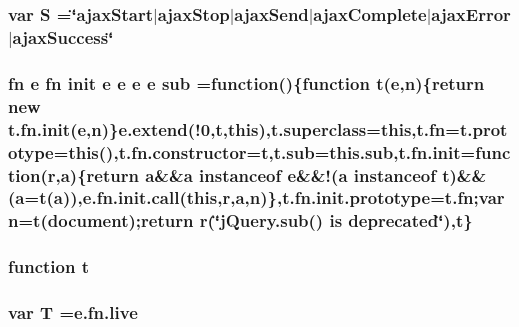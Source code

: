 \subsubsection[{S}]{\setlength{\rightskip}{0pt plus 5cm}var S =\char`\"{}ajax\+Start$\vert$ajax\+Stop$\vert$ajax\+Send$\vert$ajax\+Complete$\vert$ajax\+Error$\vert$ajax\+Success\char`\"{}}\label{jquery-migrate-1_82_81_8min_8js_a8bab16140cede5f71c657e8dc46c1887}
\hypertarget{jquery-migrate-1_82_81_8min_8js_abd5a235e9c4fffc368643d11d7701930}{}
\subsubsection[{sub}]{ {\bf fn} {\bf e} {\bf fn} {\bf init} {\bf e} {\bf e} {\bf e} {\bf e} sub =function()\{function {\bf t}({\bf e},{\bf n})\{return new {\bf t.\+fn.\+init}({\bf e},{\bf n})\}{\bf e.\+extend}(!0,{\bf t},{\bf this}),t.\+superclass={\bf this},{\bf t.\+fn}={\bf t.\+prototype}={\bf this}(),t.\+fn.\+constructor={\bf t},t.\+sub=this.\+sub,{\bf t.\+fn.\+init}=function({\bf r},{\bf a})\{return {\bf a}\&\&{\bf a} instanceof {\bf e}\&\&!({\bf a} instanceof {\bf t})\&\&({\bf a}={\bf t}({\bf a})),{\bf e.\+fn.\+init.\+call}({\bf this},{\bf r},{\bf a},{\bf n})\},{\bf t.\+fn.\+init.\+prototype}={\bf t.\+fn};var {\bf n}={\bf t}(document);return {\bf r}(\char`\"{}j\+Query.\+sub() is deprecated\char`\"{}),t\}}\label{jquery-migrate-1_82_81_8min_8js_abd5a235e9c4fffc368643d11d7701930}
\hypertarget{jquery-migrate-1_82_81_8min_8js_a23c5666e83bbbceee94adcd0851f50c4}{}
\subsubsection[{t}]{\setlength{\rightskip}{0pt plus 5cm}function t}\label{jquery-migrate-1_82_81_8min_8js_a23c5666e83bbbceee94adcd0851f50c4}
\hypertarget{jquery-migrate-1_82_81_8min_8js_aa798e0c32253f973f3154aa30c996eb2}{}
\subsubsection[{T}]{\setlength{\rightskip}{0pt plus 5cm}var T ={\bf e.\+fn.\+live}}\label{jquery-migrate-1_82_81_8min_8js_aa798e0c32253f973f3154aa30c996eb2}
\hypertarget{jquery-migrate-1_82_81_8min_8js_a43180668e085e3412510ad16aea975b3}{}
